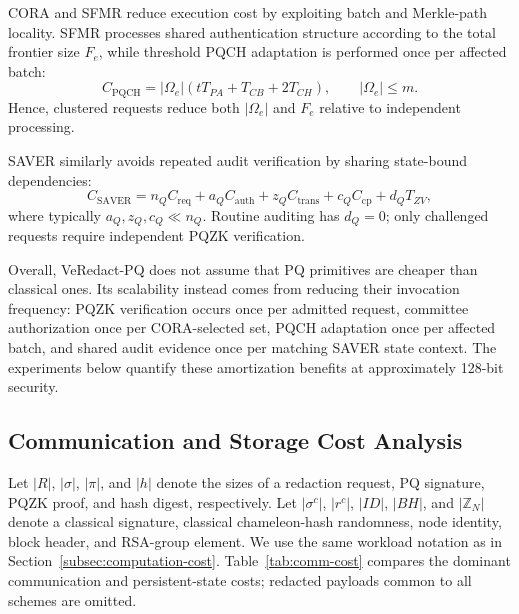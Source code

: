 \documentclass[lettersize,journal]{IEEEtran}
\begin{document}
CORA and SFMR reduce execution cost by exploiting batch and Merkle-path
locality. SFMR processes shared authentication structure according to
the total frontier size $F_e$, while threshold PQCH adaptation is
performed once per affected batch:
\begin{equation}
C_{\mathrm{PQCH}}
=
|\Omega_e|(tT_{PA}+T_{CB}+2T_{CH}),
\qquad |\Omega_e|\leq m.
\end{equation}
Hence, clustered requests reduce both $|\Omega_e|$ and $F_e$ relative
to independent processing.

SAVER similarly avoids repeated audit verification by sharing
state-bound dependencies:
\begin{equation}
C_{\mathrm{SAVER}}
=
n_QC_{\mathrm{req}}
+a_QC_{\mathrm{auth}}
+z_QC_{\mathrm{trans}}
+c_QC_{\mathrm{cp}}
+d_QT_{ZV},
\label{eq:saver_cost}
\end{equation}
where typically $a_Q,z_Q,c_Q\ll n_Q$. Routine auditing has $d_Q=0$;
only challenged requests require independent PQZK verification.

Overall, VeRedact-PQ does not assume that PQ primitives are cheaper
than classical ones. Its scalability instead comes from reducing their
invocation frequency: PQZK verification occurs once per admitted
request, committee authorization once per CORA-selected set, PQCH
adaptation once per affected batch, and shared audit evidence once per
matching SAVER state context. The experiments below quantify these
amortization benefits at approximately 128-bit security.


\subsection{Communication and Storage Cost Analysis}
\label{subsec:communication-cost}

Let $|R|$, $|\sigma|$, $|\pi|$, and $|h|$ denote the sizes of a
redaction request, PQ signature, PQZK proof, and hash digest,
respectively. Let $|\sigma^{c}|$, $|r^{c}|$, $|ID|$, $|BH|$, and
$|\mathbb{Z}_N|$ denote a classical signature, classical
chameleon-hash randomness, node identity, block header, and RSA-group
element. We use the same workload notation as in
Section~\ref{subsec:computation-cost}. Table~\ref{tab:comm-cost}
compares the dominant communication and persistent-state costs;
redacted payloads common to all schemes are omitted.
\end{document}
